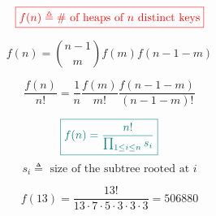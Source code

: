 \begin{frame}{}
  \[
    \textcolor{red}{\boxed{f(n) \triangleq \text{\# of heaps of } n \text{ distinct keys}}}
  \]

  \pause
  \[
    f(n) = \binom{n-1}{m} f(m) f(n-1-m)
  \]

  \pause
  \vspace{0.50cm}
  \[
    \frac{f(n)}{n!} = \frac{1}{n} \frac{f(m)}{m!} \frac{f(n-1-m)}{(n-1-m)!}
  \]

  \pause
  \vspace{0.50cm}
  \[
    \textcolor{teal}{\boxed{f(n) = \frac{n!}{\prod_{1 \le i \le n} s_i}}}
  \]
  \[
    s_i \triangleq \text{ size of the subtree rooted at } i
  \]
\end{frame}

\begin{frame}{}
  \[
    f(13) = \frac{13!}{13 \cdot 7 \cdot 5 \cdot 3 \cdot 3 \cdot 3} = 506880
  \]
\end{frame}
